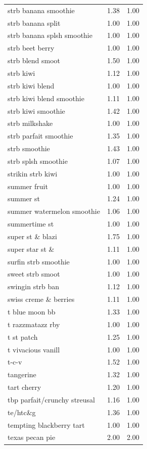 \begin{table}
\begin{tabular}{lrr}
strb banana smoothie & 1.38 & 1.00 \\
strb banana split & 1.00 & 1.00 \\
strb banana splsh smoothie & 1.00 & 1.00 \\
strb beet berry & 1.00 & 1.00 \\
strb blend smoot & 1.50 & 1.00 \\
strb kiwi & 1.12 & 1.00 \\
strb kiwi blend & 1.00 & 1.00 \\
strb kiwi blend smoothie & 1.11 & 1.00 \\
strb kiwi smoothie & 1.42 & 1.00 \\
strb milkshake & 1.00 & 1.00 \\
strb parfait smoothie & 1.35 & 1.00 \\
strb smoothie & 1.43 & 1.00 \\
strb splsh smoothie & 1.07 & 1.00 \\
strikin strb kiwi & 1.00 & 1.00 \\
summer fruit & 1.00 & 1.00 \\
summer st & 1.24 & 1.00 \\
summer watermelon smoothie & 1.06 & 1.00 \\
summertime st & 1.00 & 1.00 \\
super st \& blazi & 1.75 & 1.00 \\
super star st \& & 1.11 & 1.00 \\
surfin strb smoothie & 1.00 & 1.00 \\
sweet strb smoot & 1.00 & 1.00 \\
swingin strb ban & 1.12 & 1.00 \\
swiss creme \& berries & 1.11 & 1.00 \\
t blue moon bb & 1.33 & 1.00 \\
t razzmatazz rby & 1.00 & 1.00 \\
t st patch & 1.25 & 1.00 \\
t vivacious vanill & 1.00 & 1.00 \\
t-c-v & 1.52 & 1.00 \\
tangerine & 1.32 & 1.00 \\
tart cherry & 1.20 & 1.00 \\
tbp parfait/crunchy streusal & 1.16 & 1.00 \\
te/htc\&g & 1.36 & 1.00 \\
tempting blackberry tart & 1.00 & 1.00 \\
texas pecan pie & 2.00 & 2.00 \\

\end{tabular}
\end{table}
